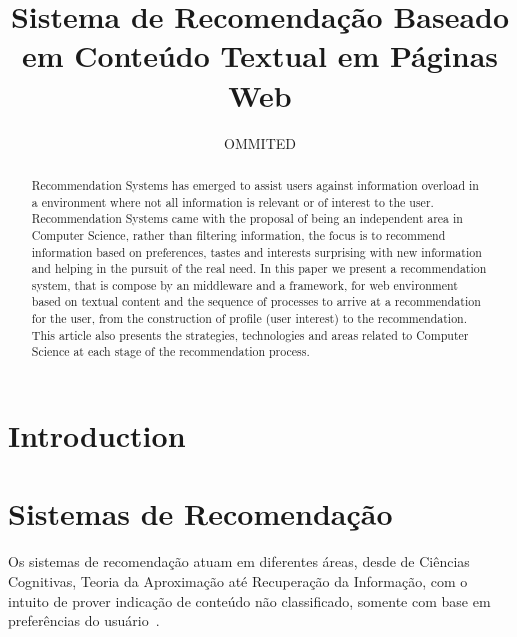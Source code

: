 \documentclass{svproc}
\begin{document}
\mainmatter              %
%
\title{Sistema de Recomendação Baseado em Conteúdo Textual em Páginas Web}
%
%
\author{OMMITED}
%
%
%

\maketitle              %

\begin{abstract}
Recommendation Systems has emerged to assist users against information overload in a environment where not all information is relevant or of interest to the user. Recommendation Systems came with the proposal of being an independent area in Computer Science, rather than filtering information, the focus is to recommend information based on preferences, tastes and interests surprising with new information and helping in the pursuit of the real need.
In this paper we present a recommendation system, that is compose by an middleware and a framework, for web environment based on textual content and the sequence of processes to arrive at a recommendation for the user, from the construction of profile (user interest) to the recommendation. This article also presents the strategies, technologies and areas related to Computer Science at each stage of the recommendation process.
\end{abstract}
%
\section{Introduction}



\section{Sistemas de Recomendação}
Os sistemas de recomendação atuam em diferentes áreas, desde de Ciências Cognitivas, Teoria da Aproximação até Recuperação da Informação, com o intuito de prover indicação de conteúdo não classificado, somente com base em preferências do usuário~\cite{resnick1997recommender}.
\end{document}
